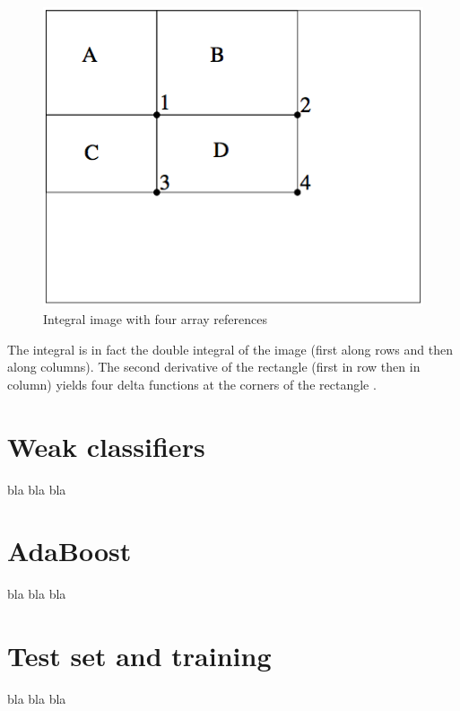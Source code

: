 \begin{figure}[!h]
\begin{center}
\noindent \includegraphics[scale=0.6]{figures/integral_image_four_array} 
\newline
\caption{Integral image with four array references}
\label{integral_image_four_array}
\end{center} 
\end{figure}

\noindent The integral is in fact the double integral of the image (first along rows and then along columns). The second derivative of the rectangle (first in row then in column) yields four delta functions at the corners of the rectangle \cite{VIO01}. 
\newline

\section{Weak classifiers}

\noindent bla bla bla
\newline

\section{AdaBoost}

\noindent bla bla bla
\newline

\section{Test set and training}

\noindent bla bla bla
\newline